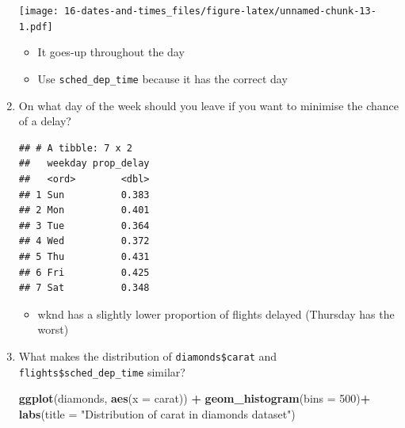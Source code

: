 \documentclass[]{book}
\newenvironment{Shaded}{\begin{snugshade}}{\end{snugshade}}
\newcommand{\DataTypeTok}[1]{\textcolor[rgb]{0.13,0.29,0.53}{#1}}
\newcommand{\DecValTok}[1]{\textcolor[rgb]{0.00,0.00,0.81}{#1}}
\newcommand{\KeywordTok}[1]{\textcolor[rgb]{0.13,0.29,0.53}{\textbf{#1}}}
\newcommand{\NormalTok}[1]{#1}
\newcommand{\OperatorTok}[1]{\textcolor[rgb]{0.81,0.36,0.00}{\textbf{#1}}}
\newcommand{\OtherTok}[1]{\textcolor[rgb]{0.56,0.35,0.01}{#1}}
\newcommand{\StringTok}[1]{\textcolor[rgb]{0.31,0.60,0.02}{#1}}
\providecommand{\tightlist}{%
  \setlength{\itemsep}{0pt}\setlength{\parskip}{0pt}}
\theoremstyle{definition}
\theoremstyle{definition}
\theoremstyle{definition}
\theoremstyle{remark}
\begin{document}
\begin{enumerate}
  \texttt{[image: 16-dates-and-times\_files/figure-latex/unnamed-chunk-13-1.pdf]}

  \begin{itemize}
  \tightlist
  \item
    It goes-up throughout the day
  \item
    Use \texttt{sched\_dep\_time} because it has the correct day
  \end{itemize}
\item
  On what day of the week should you leave if you want to minimise the
  chance of a delay?

\begin{Shaded}
\end{Shaded}

\begin{verbatim}
## # A tibble: 7 x 2
##   weekday prop_delay
##   <ord>        <dbl>
## 1 Sun          0.383
## 2 Mon          0.401
## 3 Tue          0.364
## 4 Wed          0.372
## 5 Thu          0.431
## 6 Fri          0.425
## 7 Sat          0.348
\end{verbatim}

  \begin{itemize}
  \tightlist
  \item
    wknd has a slightly lower proportion of flights delayed (Thursday
    has the worst)
  \end{itemize}
\item
  What makes the distribution of \texttt{diamonds\$carat} and
  \texttt{flights\$sched\_dep\_time} similar?

\begin{Shaded}
\begin{Highlighting}[]
\KeywordTok{ggplot}\NormalTok{(diamonds, }\KeywordTok{aes}\NormalTok{(}\DataTypeTok{x =}\NormalTok{ carat)) }\OperatorTok{+}
\StringTok{  }\KeywordTok{geom_histogram}\NormalTok{(}\DataTypeTok{bins =} \DecValTok{500}\NormalTok{)}\OperatorTok{+}
\StringTok{  }\KeywordTok{labs}\NormalTok{(}\DataTypeTok{title =} \StringTok{"Distribution of carat in diamonds dataset"}\NormalTok{)}
\end{Highlighting}
\end{Shaded}


\end{enumerate}
\end{document}
